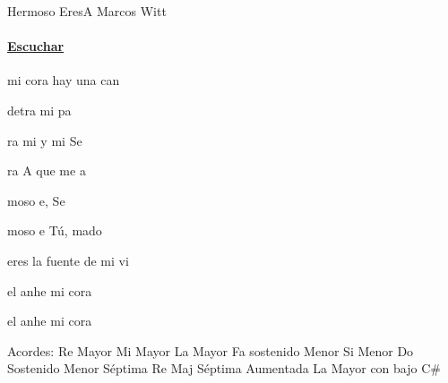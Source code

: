 \documentclass[12pt, spanish]{book}
\begin{document}
    \begin{song}{Hermoso Eres}{A}
    {} %
    {Marcos Witt}
    {} %
    {}
        \ifChordBk
        \paragraph{\mbox{}\hfill\protect\href{https://open.spotify.com/intl-es/track/3TbInL4DEBxLRExpqtHDw8}{Escuchar}\mbox{}\hfill}
        \fi


        \begin{SBOpGroup}
             mi cora hay una can

             detra mi pa

            ra mi  y mi Se~

            ra A que me a
        \end{SBOpGroup}

        \begin{SBChorus}
            moso e,  Se

            moso e Tú, mado 

             eres la fuente de mi vi

             el anhe  mi cora

             el anhe  mi cora
        \end{SBChorus}



        \ifChordBk
        \begin{SBOpGroup}
            Acordes:
            \upchord{\D}\qquad Re Mayor \hfill
            \upchord{\E}\qquad Mi Mayor \hfill\null\break
            \upchord{\A}\qquad La Mayor \hfill
            \upchord{\Fsm}Fa sostenido Menor \hfill\null\break
            \upchord{\Bm}\qquad\qquad Si Menor \hfill\null\break
            \upchord{\Csmseven}Do Sostenido Menor S\'eptima \hfill
            \upchord{\DMaj}\qquad Re Maj S\'eptima Aumentada \hfill\null\break
            \upchord{\ACs}\qquad La Mayor con bajo C\# \hfill\null\break
        \end{SBOpGroup}
        \fi


\end{song}
\end{document}

